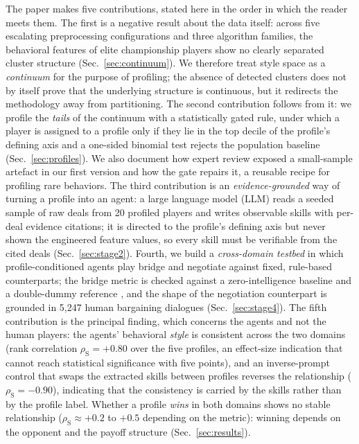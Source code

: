 \documentclass[runningheads]{llncs}
\newcommand{\rhoS}{\rho_{\mathrm{S}}}
\begin{document}
The paper makes five contributions, stated here in the order in which
the reader meets them. The first is a negative result about the data
itself: across five escalating preprocessing configurations and three
algorithm families, the behavioral features of elite championship
players show no clearly separated cluster structure
(Sec.~\ref{sec:continuum}). We therefore treat style space as a
\emph{continuum} for the purpose of profiling; the absence of detected
clusters does not by itself prove that the underlying structure is
continuous, but it redirects the methodology away from partitioning.
The second contribution
follows from it: we profile the \emph{tails} of the continuum with a
statistically gated rule, under which a player is assigned to a profile
only if they lie in the top decile of the profile's defining axis and a
one-sided binomial test rejects the population baseline
(Sec.~\ref{sec:profiles}). We also document how expert review exposed a
small-sample artefact in our first version and how the gate repairs it,
a reusable recipe for profiling rare behaviors. The third contribution
is an \emph{evidence-grounded} way of turning a profile into an agent: a
large language model (LLM) reads a seeded sample of raw deals from 20
profiled players and writes observable skills with per-deal evidence
citations; it is directed to the profile's defining axis but never shown
the engineered feature values, so every skill must be verifiable from
the cited deals (Sec.~\ref{sec:stage2}). Fourth, we build a
\emph{cross-domain testbed} in which profile-conditioned agents play
bridge and negotiate against fixed, rule-based counterparts; the bridge
metric is checked against a zero-intelligence baseline
\cite{gode1993zi} and a double-dummy reference \cite{ginsberg2001gib},
and the shape of the negotiation counterpart is grounded in 5{,}247
human bargaining dialogues \cite{he2018decoupling}
(Sec.~\ref{sec:stage4}). The fifth contribution is the principal
finding, which concerns the agents and not the human players: the
agents' behavioral \emph{style} is consistent across the two domains
(rank correlation $\rhoS=+0.80$ over the five profiles, an effect-size
indication that cannot reach statistical significance with five
points), and an inverse-prompt control that swaps the extracted skills
between profiles reverses the relationship ($\rhoS=-0.90$), indicating
that the consistency is carried by the skills rather than by the
profile label. Whether a profile \emph{wins} in both domains shows no
stable relationship ($\rhoS\approx+0.2$ to $+0.5$ depending on the
metric): winning depends on the opponent and the payoff structure
(Sec.~\ref{sec:results}).
\end{document}
